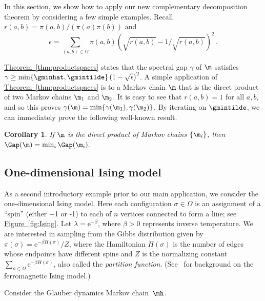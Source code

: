 \documentclass[11pt]{article}
\newtheorem{corollary}[theorem]{Corollary}
\providecommand{\eee}{\mathrm e}
\providecommand{\expref}[2]{\texorpdfstring{\hyperref[#2]{#1~\ref{#2}}}{#1~\ref{#2}}}
\begin{document}
In this section, we show how to apply our new complementary
decomposition theorem by considering a few simple examples.  Recall
$r(a,b) = \pi(a,b)/(\pi(a)\pi(b))$ and
\vspace{-.1in}
\[\epsilon = \sum_{(a,b)\in\Omega}\pi(a,b)\left(\sqrt{r(a,b)} -
1/\sqrt{r(a,b)}\right)^2\,.\]

\vspace{-.15in}

\noindent \expref{Theorem}{thm:productspaces} states that the spectral gap 
$\gamma$ of $\m$ satisfies $\gamma \geq \min\{\gminhat, 
\gmintilde\}\left(1 -\sqrt{\epsilon}\right)^2$. 
A simple application of \expref{Theorem}{thm:productspaces} is to a Markov 
chain $\m$ that is the direct product of two Markov chains $\m_1$ and $ 
\m_2$.  It is easy to see that $r(a,b)=1$ for all $a,b$, and so this proves
$\gamma(\m) = \min\{\gamma(\m_1), \gamma(\m_2)\}$.  By 
iterating on $\gmintilde$, we can immediately prove the following well-known result. 

\begin{corollary}\label{cor:product}
If $\m$ is the direct product of Markov chains $\{\m_i\}$,
then  $\Gap(\m)=\min_i\Gap(\m_i).$
\end{corollary}

\subsection{One-dimensional Ising model}\label{sec:1DIsing}

As a second introductory example prior to our main application, we 
consider the one-dimensional Ising model.  Here each configuration 
$\sigma \in \Omega$ is an assignment of a ``spin'' (either +1 or -1) to 
each of $n$ vertices connected to form a line; see 
\expref{Figure}{fig:Ising}.  Let $\lambda = \eee^{-\beta}$, where $\beta > 0$ 
represents inverse temperature.  We are interested in sampling from the 
Gibbs distribution given by $\pi(\sigma) = \eee^{-\beta H(\sigma)}/Z$, 
where the Hamiltonian $H(\sigma)$ is the number of edges whose 
endpoints have different spins and $Z$ is the normalizing constant 
$\sum_{\sigma \in \Omega} \eee^{-\beta H(\sigma)}$, also called the 
\emph{partition function}. (See~\cite{LPW06} for background on the 
ferromagnetic Ising model.) 

Consider the Glauber dynamics Markov chain~$\mh$.   

\vspace{.1in}
\end{document}
